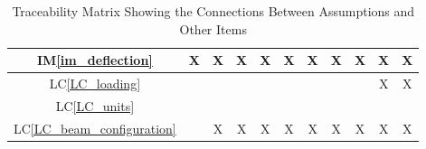 \documentclass[12pt]{article}
\newcommand{\iref}[1]{IM\ref{#1}}
\newcommand{\lcref}[1]{LC\ref{#1}}
\begin{document}
{\begin{landscape}
\begin{table}[h!]
\begin{tabular}{|c|c|c|c|c|c|c|c|c|c|c|}
                \iref{im_deflection}          & X                      & X                   & X                                 & X                          & X                                   & X                            & X                            & X                      & X                                & X                         \\ \hline
                \lcref{LC_loading}            &                        &                     &                                   &                            &                                     &                              &                              &                        & X                                & X                         \\ \hline
                \lcref{LC_units}              &                        &                     &                                   &                            &                                     &                              &                              &                        &                                  &                           \\ \hline
                \lcref{LC_beam_configuration} &                        & X                   & X                                 & X                          & X                                   & X                            & X                            & X                      & X                                & X                         \\ \hline
            \end{tabular}
            \caption{Traceability Matrix Showing the Connections Between Assumptions and Other Items}
            \label{Table:A_trace}
        \end{table}
    \end{landscape}
}
\end{document}
